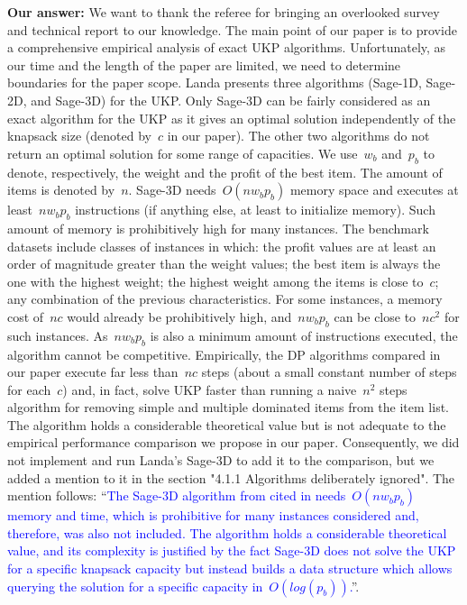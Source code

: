 \documentclass{elsarticle}
\begin{document}
\textbf{Our answer:}
We want to thank the referee for bringing an overlooked survey and technical report to our knowledge.
The main point of our paper is to provide a comprehensive empirical analysis of exact UKP algorithms.
Unfortunately, as our time and the length of the paper are limited, we need to determine boundaries for the paper scope.
Landa presents three algorithms (Sage-1D, Sage-2D, and Sage-3D) for the UKP.
Only Sage-3D can be fairly considered as an exact algorithm for the UKP as it gives an optimal solution independently of the knapsack size (denoted by~\(c\) in our paper).
The other two algorithms do not return an optimal solution for some range of capacities.
We use~\(w_b\) and~\(p_b\) to denote, respectively, the weight and the profit of the best item.
The amount of items is denoted by~\(n\).
Sage-3D needs~\(O(n w_b p_b)\) memory space and executes at least~\(n w_b p_b\) instructions (if anything else, at least to initialize memory).
Such amount of memory is prohibitively high for many instances.
The benchmark datasets include classes of instances in which: the profit values are at least an order of magnitude greater than the weight values; the best item is always the one with the highest weight; the highest weight among the items is close to~\(c\); any combination of the previous characteristics.
For some instances, a memory cost of~\(nc\) would already be prohibitively high, and~\(n w_b p_b\) can be close to~\(n c^2\) for such instances.
As~\(n w_b p_b\) is also a minimum amount of instructions executed, the algorithm cannot be competitive.
Empirically, the DP algorithms compared in our paper execute far less than~\(nc\) steps (about a small constant number of steps for each~\(c\)) and, in fact, solve UKP faster than running a naive~\(n^2\) steps algorithm for removing simple and multiple dominated items from the item list.
The algorithm holds a considerable theoretical value but is not adequate to the empirical performance comparison we propose in our paper.
Consequently, we did not implement and run Landa's Sage-3D to add it to the comparison, but we added a mention to it in the section "4.1.1 Algorithms deliberately ignored".
The mention follows: ``\textcolor{blue}{The Sage-3D algorithm from \cite{landa_sage} cited in \cite{ukp_hu_landa_shing_survey} needs~\(O(n w_b p_b)\) memory and time, which is prohibitive for many instances considered and, therefore, was also not included.
The algorithm holds a considerable theoretical value, and its complexity is justified by the fact Sage-3D does not solve the UKP for a specific knapsack capacity but instead builds a data structure which allows querying the solution for a specific capacity in~\(O(log(p_b))\).}''.
\medskip
\end{document}
